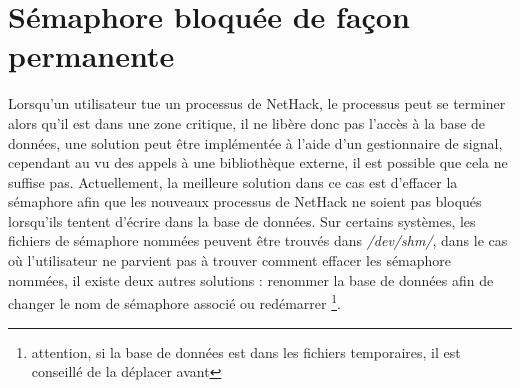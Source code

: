\documentclass[10pt,a4paper]{report}
\begin{document}
\section{Sémaphore bloquée de façon permanente}
Lorsqu'un utilisateur tue un processus de NetHack, le processus peut se terminer
alors qu'il est dans une zone critique, il ne libère donc pas l'accès à la base
de données, une solution peut être implémentée à l'aide d'un gestionnaire de
signal, cependant au vu des appels à une bibliothèque externe, il est possible
que cela ne suffise pas. Actuellement, la meilleure solution dans ce cas est
d'effacer la sémaphore afin que les nouveaux processus de NetHack ne soient pas
bloqués lorsqu'ils tentent d'écrire dans la base de données. Sur certains
systèmes, les fichiers de sémaphore nommées peuvent être trouvés dans 
\emph{/dev/shm/}, dans le cas où l'utilisateur ne parvient pas à trouver
comment effacer les sémaphore nommées, il existe deux autres solutions :
renommer la base de données afin de changer le nom de sémaphore associé ou
redémarrer \footnote{attention, si la base de données est dans les fichiers
temporaires, il est 
conseillé de la déplacer avant}.
\end{document}
